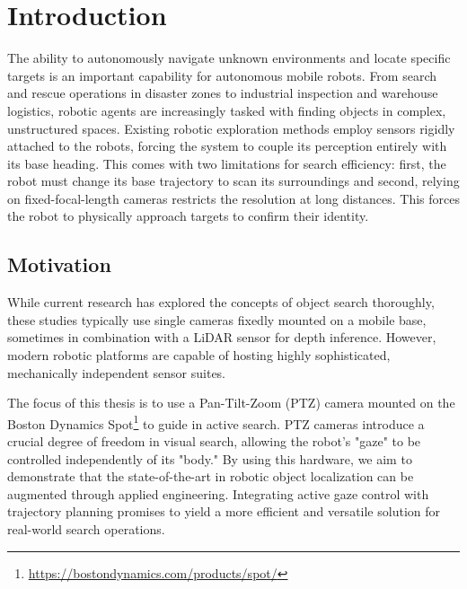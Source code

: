 \documentclass[
	parspace, %
	noindent, %
	final, %
]{elteikthesis}
\begin{document}

\cleardoublepage
\clearpage 
{}


\chapter{Introduction}
\label{ch:intro}

The ability to autonomously navigate unknown environments and locate specific targets is an important capability for autonomous mobile robots. From search and rescue operations in disaster zones to industrial inspection and warehouse logistics, robotic agents are increasingly tasked with finding objects in complex, unstructured spaces. Existing robotic exploration methods employ sensors rigidly attached to the robots, forcing the system to couple its perception entirely with its base heading. This comes with two limitations for search efficiency: first, the robot must change its base trajectory to scan its surroundings and second, relying on fixed-focal-length cameras restricts the resolution at long distances. This forces the robot to physically approach targets to confirm their identity.

\section{Motivation}
While current research has explored the concepts of object search thoroughly, these studies typically use single cameras fixedly mounted on a mobile base, sometimes in combination with a LiDAR sensor for depth inference. However, modern robotic platforms are capable of hosting highly sophisticated, mechanically independent sensor suites. 

The focus of this thesis is to use a Pan-Tilt-Zoom (PTZ) camera mounted on the Boston Dynamics Spot\footnote{\url{https://bostondynamics.com/products/spot/}} to guide in active search. PTZ cameras introduce a crucial degree of freedom in visual search, allowing the robot's "gaze" to be controlled independently of its "body." By using this hardware, we aim to demonstrate that the state-of-the-art in robotic object localization can be augmented through applied engineering. Integrating active gaze control with trajectory planning promises to yield a more efficient and versatile solution for real-world search operations.
\end{document}
